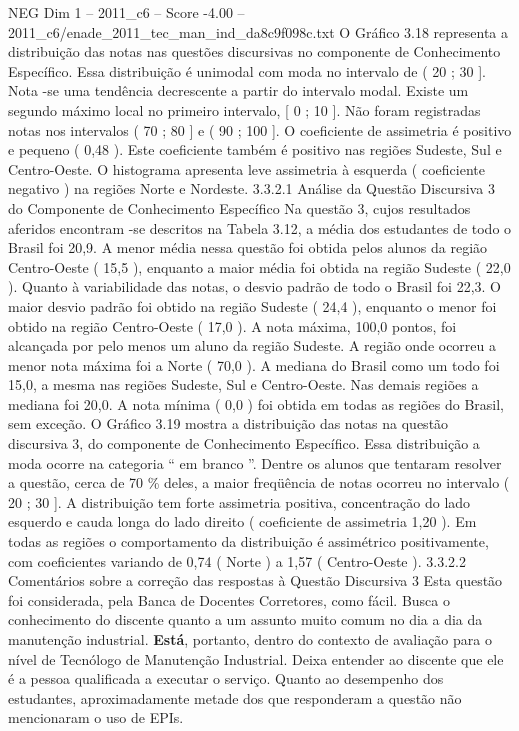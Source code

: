 \begin{textsample}{NEG Dim 1 – 2011\_c6 – Score -4.00 – 2011\_c6/enade\_2011\_tec\_man\_ind\_da8c9f098c.txt}
O Gráfico 3.18 representa a distribuição das notas nas questões discursivas no componente de Conhecimento Específico.
Essa distribuição é unimodal com moda no intervalo de ( 20 ; 30 ].
Nota -se uma tendência decrescente a partir do intervalo modal.
Existe um segundo máximo local no primeiro intervalo, [ 0 ; 10 ].
Não foram registradas notas nos intervalos ( 70 ; 80 ] e ( 90 ; 100 ].
O coeficiente de assimetria é positivo e pequeno ( 0,48 ).
Este coeficiente também é positivo nas regiões Sudeste, Sul e Centro-Oeste.
O histograma apresenta leve assimetria à esquerda ( coeficiente negativo ) na regiões Norte e Nordeste. 3.3.2.1 Análise da Questão Discursiva 3 do Componente de Conhecimento Específico Na questão 3, cujos resultados aferidos encontram -se descritos na Tabela 3.12, a média dos estudantes de todo o Brasil foi 20,9.
A menor média nessa questão foi obtida pelos alunos da região Centro-Oeste ( 15,5 ), enquanto a maior média foi obtida na região Sudeste ( 22,0 ).
Quanto à variabilidade das notas, o desvio padrão de todo o Brasil foi 22,3.
O maior desvio padrão foi obtido na região Sudeste ( 24,4 ), enquanto o menor foi obtido na região Centro-Oeste ( 17,0 ).
A nota máxima, 100,0 pontos, foi alcançada por pelo menos um aluno da região Sudeste.
A região onde ocorreu a menor nota máxima foi a Norte ( 70,0 ).
A mediana do Brasil como um todo foi 15,0, a mesma nas regiões Sudeste, Sul e Centro-Oeste.
Nas demais regiões a mediana foi 20,0.
A nota mínima ( 0,0 ) foi obtida em todas as regiões do Brasil, sem exceção.
O Gráfico 3.19 mostra a distribuição das notas na questão discursiva 3, do componente de Conhecimento Específico.
Essa distribuição a moda ocorre na categoria “ em branco ”.
Dentre os alunos que tentaram resolver a questão, cerca de 70 \% deles, a maior freqüência de notas ocorreu no intervalo ( 20 ; 30 ].
A distribuição tem forte assimetria positiva, concentração do lado esquerdo e cauda longa do lado direito ( coeficiente de assimetria 1,20 ).
Em todas as regiões o comportamento da distribuição é assimétrico positivamente, com coeficientes variando de 0,74 ( Norte ) a 1,57 ( Centro-Oeste ). 3.3.2.2 Comentários sobre a correção das respostas à Questão Discursiva 3 Esta questão foi considerada, pela Banca de Docentes Corretores, como fácil.
Busca o conhecimento do discente quanto a um assunto muito comum no dia a dia da manutenção industrial. \textbf{Está}, portanto, dentro do contexto de avaliação para o nível de Tecnólogo de Manutenção Industrial.
Deixa entender ao discente que ele é a pessoa qualificada a executar o serviço.
Quanto ao desempenho dos estudantes, aproximadamente metade dos que responderam a questão não mencionaram o uso de EPIs.

\end{textsample}
